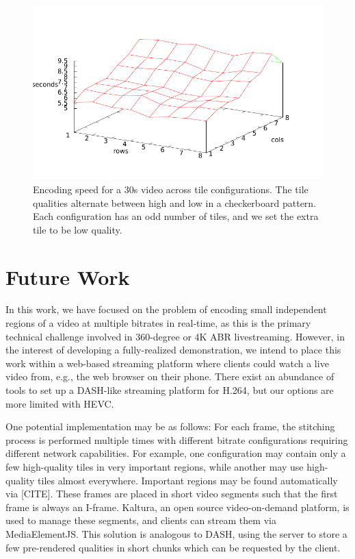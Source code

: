 \begin{figure}[t]
	\includegraphics[width=\columnwidth]{figures/Times.pdf}
	\caption{Encoding speed for a 30s video across tile configurations. The tile qualities alternate between high and low in a checkerboard pattern. Each configuration has an odd number of tiles, and we set the extra tile to be low quality.}
\end{figure}

\section{Future Work}

In this work, we have focused on the problem of encoding small independent regions of a video at multiple bitrates in real-time, as this is the primary technical challenge involved in 360-degree or 4K ABR livestreaming. However, in the interest of developing a fully-realized demonstration, we intend to place this work within a web-based streaming platform where clients could watch a live video from, e.g., the web browser on their phone. There exist an abundance of tools to set up a DASH-like streaming platform for H.264, but our options are more limited with HEVC.

One potential implementation may be as follows: For each frame, the stitching process is performed multiple times with different bitrate configurations requiring different network capabilities. For example, one configuration may contain only a few high-quality tiles in very important regions, while another may use high-quality tiles almost everywhere. Important regions may be found automatically via [CITE]. These frames are placed in short video segments such that the first frame is always an I-frame. Kaltura, an open source video-on-demand platform, is used to manage these segments, and clients can stream them via MediaElementJS. This solution is analogous to DASH, using the server to store a few pre-rendered qualities in short chunks which can be requested by the client.


